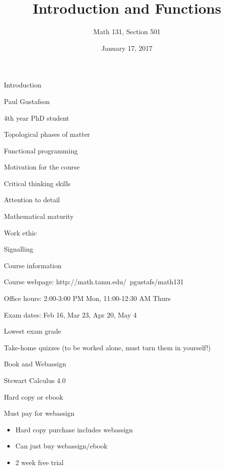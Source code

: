 \documentclass[t]{beamer}
\title{Introduction and Functions}
\author{Math 131, Section 501}
\date{January 17, 2017}
\newenvironment{fpi}
  {\itemize[nolistsep,itemsep=\fill]}
  {\vfill\enditemize}
\begin{document}
\frame{\titlepage}


\begin{frame}{Introduction}
\begin{fpi}
\item Paul Gustafson
\item 4th year PhD student
\item Topological phases of matter 
\item Functional programming
\end{fpi}
\end{frame}

\begin{frame}{Motivation for the course}
\begin{fpi}
\item Critical thinking skills
\item Attention to detail
\item Mathematical maturity 
\item Work ethic
\item Signalling 
\end{fpi}
\end{frame}

\begin{frame}{Course information}
\begin{fpi}
\item Course webpage: http://math.tamu.edu/~pgustafs/math131
\item Office hours: 2:00-3:00 PM Mon, 11:00-12:30 AM Thurs 
\item Exam dates: Feb 16, Mar 23, Apr 20, May 4
\item Lowest exam grade
\item Take-home quizzes (to be worked alone, must turn them in yourself!)
\end{fpi}
\end{frame}

\begin{frame}{Book and Webassign}
\begin{fpi}
\item Stewart Calculus 4.0
\item Hard copy or ebook
\item Must pay for webassign
\begin{itemize}
\item Hard copy purchase includes webassign
\item Can just buy webassign/ebook
\item 2 week free trial 
\end{itemize}
\end{fpi}
\end{frame}
\end{document}
